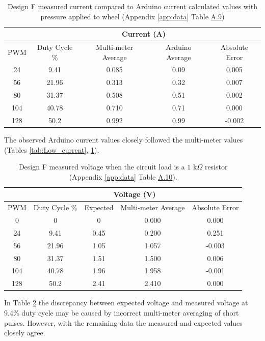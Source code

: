 \begin{table}[H]
    \centering
    \caption[Design F: Current Measurements]{Design F measured current compared to Arduino current calculated values with pressure applied to wheel (Appendix \ref{app:data} Table \hyperref[tab:A.9]{A.9})}
    \label{tab:Low_current_pressure}
    \begin{tabular}{|c|c||c|c||c|}\hline
     &&\multicolumn{2}{|c||}{Current (A)} &  \\\hline
    PWM &Duty Cycle \%&Multi-meter Average&Arduino Average&Absolute Error \\ \hline 
    24 &9.41&0.085&0.09&0.005\\ \hline
    56 &21.96&0.313&0.32&0.007\\\hline
    80 &31.37&0.508&0.51&0.002\\\hline
    104 &40.78&0.710&0.71&0.000\\\hline
    128 &50.2&0.992&0.99&-0.002\\\hline\end{tabular}  
\end{table}

The observed Arduino current values closely followed the multi-meter values (Tables \ref{tab:Low_current}, \ref{tab:Low_current_pressure}).

\begin{table}[H]
    \centering
    \caption[Design F: Voltage Measurements \(1\) k\(\Omega\) Resistor Load]{Design F measured voltage when the circuit load is a \(1\) k\(\Omega\) resistor (Appendix \ref{app:data} Table \hyperref[tab:A.10]{A.10}).}
    \label{tab:low_voltage_1k}
    \begin{tabular}{|c|c||c|c||c|}\hline
     &&\multicolumn{2}{|c||}{Voltage (V)} &  \\\hline
    PWM &Duty Cycle \%&Expected&Multi-meter Average&Absolute Error \\ \hline 
    0&0&0&0.000&0.000\\ \hline
    24&9.41&0.45&0.200&0.251\\\hline
    56&21.96&1.05&1.057&-0.003\\\hline
    80&31.37&1.51&1.500&0.006\\\hline
    104&40.78&1.96&1.958&-0.001\\\hline
 128& 50.2& 2.41& 2.410&0.000\\\hline\end{tabular}  
\end{table}

In Table \ref{tab:low_voltage_1k} the discrepancy between expected voltage and measured voltage at 9.4\% duty cycle may be caused by incorrect multi-meter averaging of short pulses. However, with the remaining data the measured and expected values closely agree.

